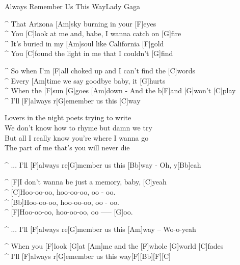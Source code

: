 \begin{song}{Always Remember Us This Way}{Lady Gaga}

\begin{guitar}
^ That Arizona [Am]sky burning in your [F]eyes\\
^ You [C]look at me and, babe, I wanna catch on [G]fire\\
^ It’s buried in my [Am]soul like California [F]gold\\
^ You [C]found the light in me that I couldn’t [G]find\\
\end{guitar}

\begin{guitar}
^ So when I'm [F]all choked up and I can't find the [C]words\\
^ Every [Am]time we say goodbye baby, it [G]hurts\\
^ When the [F]sun [G]goes [Am]down - And the b[F]and [G]won't [C]play\\
^ I'll [F]always r[G]emember us this [C]way\\
\end{guitar}

\begin{guitar}
Lovers in the night poets trying to write\\
We don't know how to rhyme but damn we try\\
But all I really know you're where I wanna go\\
The part of me that's you will never die\\
\end{guitar}

\begin{guitar}
^ ... I'll [F]always re[G]member us this [Bb]way - Oh, y[Bb]eah\\
\end{guitar}

\begin{guitar}
^ [F]I don't wanna be just a memory, baby, [C]yeah\\
^ [C]Hoo-oo-oo, hoo-oo-oo, oo - oo.\\
^ [Bb]Hoo-oo-oo, hoo-oo-oo, oo - oo.\\
^ [F]Hoo-oo-oo, hoo-oo-oo, oo ----- [G]oo.\\
\end{guitar}


\begin{guitar}
^ ... I'll [F]always re[G]member us this [Am]way – Wo-o-yeah\\
\end{guitar}


\begin{guitar}
^ When you [F]look [G]at [Am]me and the [F]whole [G]world [C]fades\\
^ I'll [F]always r[G]emember us this way[F][Bb][F][C]\\
\end{guitar}
\end{song}
